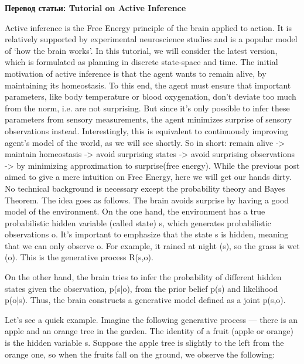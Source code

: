 \documentclass[12pt]{article}
\begin{document}
	
\begin{center}
\textbf{Перевод статьи: Tutorial on Active Inference}\\[-10mm]
\end{center}

Active inference is the Free Energy principle of the brain applied to action. It is relatively supported by experimental neuroscience studies and is a popular model of ‘how the brain works’. In this tutorial, we will consider the latest version, which is formulated as planning in discrete state-space and time. The initial motivation of active inference is that the agent wants to remain alive, by maintaining its homeostasis. To this end, the agent must ensure that important parameters, like body temperature or blood oxygenation, don’t deviate too much from the norm, i.e. are not surprising. But since it’s only possible to infer these parameters from sensory measurements, the agent minimizes surprise of sensory observations instead. Interestingly, this is equivalent to continuously improving agent’s model of the world, as we will see shortly. So in short: remain alive -> maintain homeostasis -> avoid surprising states -> avoid surprising observations -> by minimizing approximation to surprise(free energy). While the previous post aimed to give a mere intuition on Free Energy, here we will get our hands dirty. No technical background is necessary except the probability theory and Bayes Theorem. The idea goes as follows.
The brain avoids surprise by having a good model of the environment. On the one hand, the environment has a true probabilistic hidden variable (called state) s, which generates probabilistic observations o. It’s important to emphasize that the state s is hidden, meaning that we can only observe o. For example, it rained at night (s), so the grass is wet (o). This is the generative process R(s,o).

On the other hand, the brain tries to infer the probability of different hidden states given the observation, p(s|o), from the prior belief p(s) and likelihood p(o|s). Thus, the brain constructs a generative model defined as a joint p(s,o).

Let’s see a quick example. Imagine the following generative process — there is an apple and an orange tree in the garden. The identity of a fruit (apple or orange) is the hidden variable s. Suppose the apple tree is slightly to the left from the orange one, so when the fruits fall on the ground, we observe the following:
\end{document}
